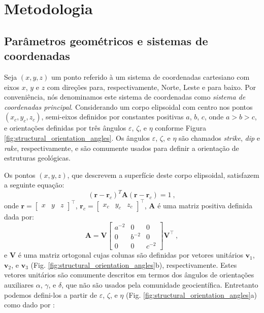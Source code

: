 \chapter{Metodologia}

\section{Parâmetros geométricos e sistemas de coordenadas}

Seja $(x, y, z)$ um ponto referido à um sistema de coordenadas cartesiano com eixos $x$, $y$ e $z$ com direções para, respectivamente, Norte, Leste e para baixo. Por conveniência, nós denominamos este sistema de coordenadas como \textit{sistema de coordenadas principal}.
Considerando um corpo elipsoidal com centro nos pontos $(x_{c}, y_{c}, z_{c})$, semi-eixos definidos por constantes positivas $a$, $b$, $c$, 
onde $a > b > c$, e orientações definidas por três ângulos $\varepsilon$, $\zeta$, e $\eta$ conforme Figura \ref{fig:structural_orientation_angles}. Os ângulos $\varepsilon$, $\zeta$, e $\eta$ são chamados \textit{strike}, \textit{dip} e \textit{rake}, respectivamente, e são comumente usados para definir a orientação de estruturas geológicas\citep{clark1986, allmendinger2012}. 

Os pontos $(x, y, z)$, que descrevem a superfície deste corpo elipsoidal, satisfazem a seguinte equação:
\begin{equation}
(\mathbf{r} - \mathbf{r}_c)^T \mathbf{A} (\mathbf{r} - \mathbf{r}_c) = 1 \: ,
\label{eq:ellipsoid_surface}
\end{equation}
onde $\mathbf{r} = [\begin{array}{ccc} x & y & z \end{array} ]^{\top}$,
$\mathbf{r}_{c} = [\begin{array}{ccc} x_{c} & y_{c} & z_{c} \end{array} ]^{\top}$,
$\mathbf{A}$ é uma matriz positiva definida dada por:
\begin{equation}
\mathbf{A} = \mathbf{V}
\left[ \begin{array}{ccc}
a^{-2} & 0 & 0 \\
0 & b^{-2} & 0 \\
0 & 0 & c^{-2} 
\end{array} \right] \mathbf{V}^{\top} \: ,
\label{eq:A}
\end{equation}
e $\mathbf{V}$ é uma matriz ortogonal cujas colunas são definidas por vetores unitários $\mathbf{v}_{1}$, $\mathbf{v}_{2}$, e $\mathbf{v}_{3}$ (Fig. \ref{fig:structural_orientation_angles}b), respectivamente. Estes vetores unitários são comumente descritos em termos dos ângulos de orientações auxiliares $\alpha$, $\gamma$, e $\delta$, que não são usados pela comunidade geocientífica. Entretanto podemos defini-los a partir de $\varepsilon$, $\zeta$, e $\eta$ (Fig. \ref{fig:structural_orientation_angles}a) como dado por \citep{clark1986}:

